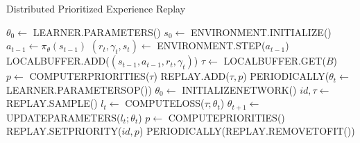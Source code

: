 \documentclass[12pt,a4paper]{article}
\begin{document}
\begin{algorithm}
\caption{Distributed Prioritized Experience Replay}
\begin{algorithmic}

	\State $\theta_{0} \leftarrow$ LEARNER.PARAMETERS() %
	\State $s_0 \leftarrow$ ENVIRONMENT.INITIALIZE()  %
		\State $a_{t-1} \leftarrow \pi_{\theta}(s_{t-1})$ %
		\State $(r_t, \gamma_t, s_{t}) \leftarrow $ ENVIRONMENT.STEP($a_{t-1}$) %
		\State LOCALBUFFER.ADD($(s_{t-1}, a_{t-1}, r_t, \gamma_t)$) %
			\State $\tau \leftarrow$ LOCALBUFFER.GET($B$) %
			\State $p \leftarrow$ COMPUTERPRIORITIES($\tau$) %
			\State REPLAY.ADD($\tau, p$) %
		\EndIf
		\State PERIODICALLY($\theta_{t} \leftarrow$ LEARNER.PARAMETERSOP()) %
	\EndFor
\EndProcedure
\State
{}
	\State $\theta_{0} \leftarrow$ INITIALIZENETWORK() %
		\State $id, \tau \leftarrow $ REPLAY.SAMPLE() %
		\State $l_{t} \leftarrow $ COMPUTELOSS($\tau; \theta_{t}$) %
		\State $\theta_{t+1} \leftarrow$ UPDATEPARAMETERS($l_{t};\theta_{t}$)
		\State $p \leftarrow$ COMPUTEPRIORITIES() %
		\State REPLAY.SETPRIORITY($id, p$) %
		\State PERIODICALLY(REPLAY.REMOVETOFIT()) %
	\EndFor
\EndProcedure
\end{algorithmic}
\end{algorithm}
\end{document}
